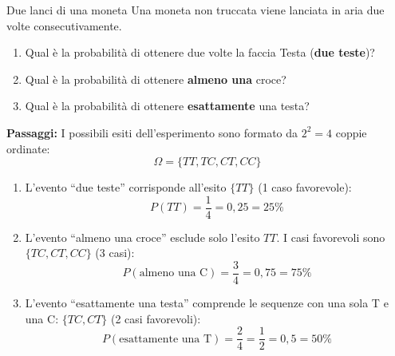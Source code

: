 \condnewpage

\begin{esercizio}{Due lanci di una moneta}
Una moneta non truccata viene lanciata in aria due volte consecutivamente.

\begin{enumerate}[label=\alph*)]
  \item Qual è la probabilità di ottenere due volte la faccia Testa (\textbf{due teste})?
  \item Qual è la probabilità di ottenere \textbf{almeno una} croce?
  \item Qual è la probabilità di ottenere \textbf{esattamente} una testa?
\end{enumerate}

\responsespace{3.0cm}

\begin{soluzione}
  \begin{center}
  \end{center}

  \textbf{Passaggi:}
  I possibili esiti dell'esperimento sono formato da $2^2 = 4$ coppie ordinate:
  \[
  \Omega = \{TT, TC, CT, CC\}
  \]
  \begin{enumerate}[label=\alph*)]
    \item L'evento ``due teste'' corrisponde all'esito $\{TT\}$ (1 caso favorevole):
    \[
    P(TT) = \frac{1}{4} = 0{,}25 = 25\%
    \]
    \item L'evento ``almeno una croce'' esclude solo l'esito $TT$. I casi favorevoli sono $\{TC, CT, CC\}$ (3 casi):
    \[
    P(\text{almeno una C}) = \frac{3}{4} = 0{,}75 = 75\%
    \]
    \item L'evento ``esattamente una testa'' comprende le sequenze con una sola T e una C: $\{TC, CT\}$ (2 casi favorevoli):
    \[
    P(\text{esattamente una T}) = \frac{2}{4} = \frac{1}{2} = 0{,}5 = 50\%
    \]
  \end{enumerate}
\end{soluzione}
\end{esercizio}

